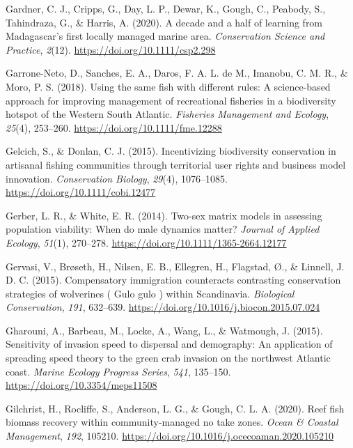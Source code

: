 \documentclass[
  12pt,
]{article}
\newlength{\cslhangindent}
\newlength{\cslentryspacingunit} %
\newenvironment{CSLReferences}[2] %
 {%
  \setlength{\parindent}{0pt}
  \ifodd #1
  \let\oldpar\par
  \def\par{\hangindent=\cslhangindent\oldpar}
  \fi
  \setlength{\parskip}{#2\cslentryspacingunit}
 }%
 {}
\begin{document}
\begin{CSLReferences}{1}{2}
\leavevmode{}%
Gardner, C. J., Cripps, G., Day, L. P., Dewar, K., Gough, C., Peabody, S., Tahindraza, G., \& Harris, A. (2020). A decade and a half of learning from {Madagascar}'s first locally managed marine area. \emph{Conservation Science and Practice}, \emph{2}(12). \url{https://doi.org/10.1111/csp2.298}

\leavevmode{}%
Garrone-Neto, D., Sanches, E. A., Daros, F. A. L. de M., Imanobu, C. M. R., \& Moro, P. S. (2018). Using the same fish with different rules: {A} science-based approach for improving management of recreational fisheries in a biodiversity hotspot of the {Western} {South} {Atlantic}. \emph{Fisheries Management and Ecology}, \emph{25}(4), 253--260. \url{https://doi.org/10.1111/fme.12288}

\leavevmode{}%
Gelcich, S., \& Donlan, C. J. (2015). Incentivizing biodiversity conservation in artisanal fishing communities through territorial user rights and business model innovation. \emph{Conservation Biology}, \emph{29}(4), 1076--1085. \url{https://doi.org/10.1111/cobi.12477}

\leavevmode{}%
Gerber, L. R., \& White, E. R. (2014). Two-sex matrix models in assessing population viability: When do male dynamics matter? \emph{Journal of Applied Ecology}, \emph{51}(1), 270--278. \url{https://doi.org/10.1111/1365-2664.12177}

\leavevmode{}%
Gervasi, V., Brøseth, H., Nilsen, E. B., Ellegren, H., Flagstad, Ø., \& Linnell, J. D. C. (2015). Compensatory immigration counteracts contrasting conservation strategies of wolverines ( {Gulo} gulo ) within {Scandinavia}. \emph{Biological Conservation}, \emph{191}, 632--639. \url{https://doi.org/10.1016/j.biocon.2015.07.024}

\leavevmode{}%
Gharouni, A., Barbeau, M., Locke, A., Wang, L., \& Watmough, J. (2015). Sensitivity of invasion speed to dispersal and demography: An application of spreading speed theory to the green crab invasion on the northwest {Atlantic} coast. \emph{Marine Ecology Progress Series}, \emph{541}, 135--150. \url{https://doi.org/10.3354/meps11508}

\leavevmode{}%
Gilchrist, H., Rocliffe, S., Anderson, L. G., \& Gough, C. L. A. (2020). Reef fish biomass recovery within community-managed no take zones. \emph{Ocean \& Coastal Management}, \emph{192}, 105210. \url{https://doi.org/10.1016/j.ocecoaman.2020.105210}


\end{CSLReferences}
\end{document}
